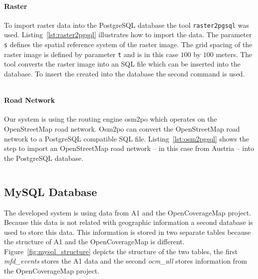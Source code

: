 \documentclass[master,english]{hgbthesis}
\begin{document}
\paragraph{Raster}

To import raster data into the PostgreSQL database the tool \verb|raster2pgsql| was used. Listing~\ref{lst:raster2pgsql} illustrates how to import the data. The parameter \verb|s| defines the spatial reference system of the raster image. The grid spacing of the raster image is defined by parameter \verb|t| and is in this case $100$ by $100$ meters. The tool converts the raster image into an SQL file which can be inserted into the database. To insert the created into the database the second command is used.

\begin{lstlisting}[style=BashInputStyle,caption={Import raster data into PostgreSQL database},label={lst:raster2pgsql}]

\end{lstlisting}

\paragraph{Road Network}

Our system is using the routing engine osm2po which operates on the OpenStreetMap road network. Osm2po can convert the OpenStreetMap road network to a PostgreSQL compatible SQL file. Listing~\ref{lst:osm2pgsql} shows the step to import an OpenStreetMap road network -- in this case from Austria -- into the PostgreSQL  database.

\begin{lstlisting}[style=BashInputStyle,caption={Import OpenStreetmap data into PostgreSQL database},label={lst:osm2pgsql}]

\end{lstlisting}

\subsection{MySQL Database}

The developed system is using data from A1 and the OpenCoverageMap project. Because this data is not related with geographic information a second database is used to store this data. This information is stored in two separate tables because the structure of A1 and the OpenCoverageMap is different. Figure~\ref{fig:mysql_structure} depicts the structure of the two tables, the first \emph{mfd_events} stores the A1 data and the second \emph{ocm_all} stores information from the OpenCoverageMap project.
\end{document}

